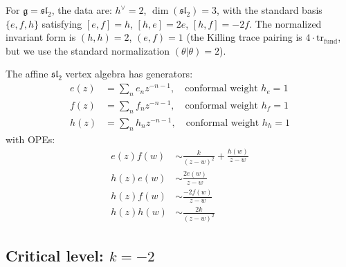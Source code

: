 For $\mathfrak{g} = \mathfrak{sl}_2$, the data are: $h^\vee = 2$, $\dim(\mathfrak{sl}_2) = 3$, with the standard basis $\{e, f, h\}$ satisfying $[e,f] = h$, $[h,e] = 2e$, $[h,f] = -2f$. The normalized invariant form is $(h,h) = 2$, $(e,f) = 1$ (the Killing trace pairing is $4 \cdot \mathrm{tr}_{\mathrm{fund}}$, but we use the standard normalization $(\theta|\theta) = 2$).

\begin{definition}
The affine $\mathfrak{sl}_2$ vertex algebra has generators:
\begin{align}
e(z) &= \sum_n e_n z^{-n-1}, \quad \text{conformal weight } h_e = 1 \\
f(z) &= \sum_n f_n z^{-n-1}, \quad \text{conformal weight } h_f = 1 \\
h(z) &= \sum_n h_n z^{-n-1}, \quad \text{conformal weight } h_h = 1
\end{align}
with OPEs:
\begin{align}
e(z) f(w) &\sim \frac{k}{(z-w)^2} + \frac{h(w)}{z-w} \\
h(z) e(w) &\sim \frac{2e(w)}{z-w} \\
h(z) f(w) &\sim \frac{-2f(w)}{z-w} \\
h(z) h(w) &\sim \frac{2k}{(z-w)^2}
\end{align}
\end{definition}

\subsection{\texorpdfstring{Critical level: $k = -2$}{Critical level: k = -2}}

